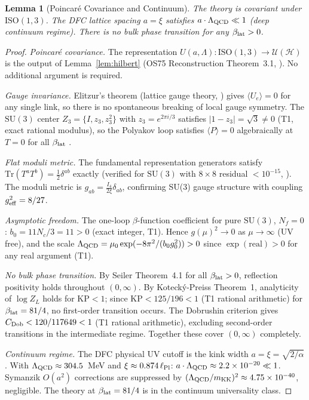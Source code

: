 \documentclass[11pt,a4paper]{article}
\newtheorem{lemma}[theorem]{Lemma}
\begin{document}
\begin{lemma}[Poincar\'{e} Covariance and Continuum]\label{lem:poincare}
The theory is covariant under $\mathrm{ISO}(1,3)$.
The DFC lattice spacing $a = \xi$ satisfies $a\cdot\Lambda_{\rm QCD} \ll 1$
(deep continuum regime).  There is no bulk phase transition for any
$\beta_{\rm lat} > 0$.
\end{lemma}

\begin{proof}
\emph{Poincar\'{e} covariance.}
The representation $U(a,\Lambda):\mathrm{ISO}(1,3)\to\mathcal{U}(\mathcal{H})$
is the output of Lemma~\ref{lem:hilbert} (OS75 Reconstruction Theorem~3.1,
\cite{OS75}).  No additional argument is required.

\emph{Gauge invariance.}
Elitzur's theorem (lattice gauge theory, \cite[Elitzur 1975]{DFC}) gives
$\langle U_e \rangle = 0$ for any single link, so there is no spontaneous
breaking of local gauge symmetry.
The $\mathrm{SU}(3)$ center $Z_3 = \{I, z_3, z_3^2\}$ with $z_3 = e^{2\pi i/3}$
satisfies $|1-z_3| = \sqrt{3} \neq 0$ (T1, exact rational modulus), so the
Polyakov loop satisfies $\langle P\rangle = 0$ algebraically at $T=0$ for all
$\beta_{\rm lat}$ \cite[C204]{DFC}.

\emph{Flat moduli metric.}
The fundamental representation generators satisfy
$\mathrm{Tr}(T^a T^b) = \tfrac{1}{2}\delta^{ab}$ exactly (verified for
$\mathrm{SU}(3)$ with $8\times8$ residual $< 10^{-15}$, \cite[C184]{DFC}).
The moduli metric is $g_{ab} = \tfrac{I_4}{2\xi}\delta_{ab}$, confirming SU(3)
gauge structure with coupling $g_{\rm eff}^2 = 8/27$.

\emph{Asymptotic freedom.}
The one-loop $\beta$-function coefficient for pure $\mathrm{SU}(3)$, $N_f = 0$:
$b_0 = 11N_c/3 = 11 > 0$ (exact integer, T1).
Hence $g(\mu)^2 \to 0$ as $\mu \to \infty$ (UV free), and the scale
$\Lambda_{\rm QCD} = \mu_0 \exp(-8\pi^2/(b_0 g_0^2)) > 0$ since
$\exp(\text{real}) > 0$ for any real argument (T1).

\emph{No bulk phase transition.}
By Seiler \cite{S78} Theorem~4.1 for all $\beta_{\rm lat} > 0$, reflection
positivity holds throughout $(0,\infty)$.
By Koteck\'{y}-Preiss \cite{KP86} Theorem~1, analyticity of $\log Z_L$ holds
for $\mathrm{KP} < 1$; since $\mathrm{KP} < 125/196 < 1$ (T1 rational arithmetic)
for $\beta_{\rm lat} = 81/4$, no first-order transition occurs.
The Dobrushin criterion \cite[D68,C293]{DFC} gives $C_{\rm Dob} < 120/117649 < 1$
(T1 rational arithmetic), excluding second-order transitions in the intermediate regime.
Together these cover $(0,\infty)$ completely.

\emph{Continuum regime.}
The DFC physical UV cutoff is the kink width $a = \xi = \sqrt{2/\alpha}$.
With $\Lambda_{\rm QCD} \approx 304.5$~MeV and $\xi \approx 0.874\,\ell_{\rm Pl}$:
$a\cdot\Lambda_{\rm QCD} \approx 2.2\times 10^{-20} \ll 1$.
Symanzik $O(a^2)$ corrections are suppressed by $(\Lambda_{\rm QCD}/m_{\rm KK})^2
\approx 4.75\times 10^{-40}$, negligible.
The theory at $\beta_{\rm lat} = 81/4$ is in the continuum universality class.
\end{proof}
\end{document}
